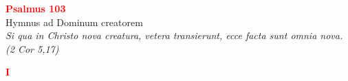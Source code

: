 


\def\greinitialformat#1{%
{\fontsize{39}{39}\selectfont #1}%
}




\vspace{0.3cm}
\begin{center}
 \textcolor{red}{\large \bf Psalmus 103}\\
Hymnus ad Dominum creatorem\\
\textit{\small Si qua in Christo nova creatura, vetera transierunt, ecce facta sunt omnia nova. (2 Cor 5,17)}
\end{center}
\begin{center}
\textcolor{red}{\bf I}
\end{center}
